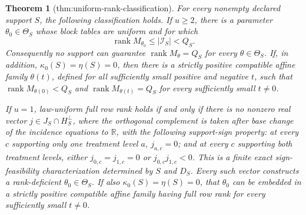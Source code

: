\documentclass{article}
\newtheorem{theorem}{Theorem}
\begin{document}
\begin{theorem}[thm:uniform-rank-classification]\label{thm:uniform-rank-classification}
For every nonempty declared support \(S\), the following classification holds.  If \(u\geq 2\), there is a parameter \(\theta_0\in\Theta_S\) whose block tables are uniform and for which
\[
\operatorname{rank}M_{\theta_0}\leq |\mathcal I_S|<Q_S.
\]
Consequently no support can guarantee \(\operatorname{rank}M_\theta=Q_S\) for every \(\theta\in\Theta_S\).  If, in addition, \(\kappa_0(S)=\eta(S)=0\), then there is a strictly positive compatible affine family \(\theta(t)\), defined for all sufficiently small positive and negative \(t\), such that \(\operatorname{rank}M_{\theta(0)}<Q_S\) and \(\operatorname{rank}M_{\theta(t)}=Q_S\) for every sufficiently small \(t\neq0\).

If \(u=1\), law-uniform full row rank holds if and only if there is no nonzero real vector \(j\in J_S\cap H_S^\perp\), where the orthogonal complement is taken after base change of the incidence equations to \(\mathbb R\), with the following support-sign property: at every \(c\) supporting only one treatment level \(a\), \(j_{a,c}=0\); and at every \(c\) supporting both treatment levels, either \(j_{0,c}=j_{1,c}=0\) or \(j_{0,c}j_{1,c}<0\).  This is a finite exact sign-feasibility characterization determined by \(S\) and \(D_S\).  Every such vector constructs a rank-deficient \(\theta_0\in\Theta_S\).  If also \(\kappa_0(S)=\eta(S)=0\), that \(\theta_0\) can be embedded in a strictly positive compatible affine family having full row rank for every sufficiently small \(t\neq0\).
\end{theorem}
\end{document}
